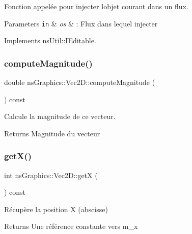 Fonction appelée pour injecter l\textquotesingle{}objet courant dans un flux. 


\begin{DoxyParams}[1]{Parameters}
\mbox{\tt in}  & {\em os} & \+: Flux dans lequel injecter \\
\hline
\end{DoxyParams}


Implements \hyperlink{classns_util_1_1_i_editable_ab20bbe582b95383ed3f1453109035853}{ns\+Util\+::\+I\+Editable}.

\mbox{\label{classns_graphics_1_1_vec2_d_adf603dcb6f44ff82f3d48df141e11fe7}} 
\subsubsection{\texorpdfstring{compute\+Magnitude()}{computeMagnitude()}}
{\footnotesize\ttfamily double ns\+Graphics\+::\+Vec2\+D\+::compute\+Magnitude (\begin{DoxyParamCaption}{ }\end{DoxyParamCaption}) const}



Calcule la magnitude de ce vecteur. 

\begin{DoxyReturn}{Returns}
Magnitude du vecteur 
\end{DoxyReturn}
\mbox{\label{classns_graphics_1_1_vec2_d_abcf3d729b05b3cd93e9eff21c74b89a1}} 
\subsubsection{\texorpdfstring{get\+X()}{getX()}}
{\footnotesize\ttfamily int ns\+Graphics\+::\+Vec2\+D\+::getX (\begin{DoxyParamCaption}{ }\end{DoxyParamCaption}) const}



Récupère la position X (abscisse) 

\begin{DoxyReturn}{Returns}
Une référence constante vers m\+\_\+x 
\end{DoxyReturn}
\mbox{\label{classns_graphics_1_1_vec2_d_ae70fbda9cca27b9dc0fe068a38ae5e5e}} 
